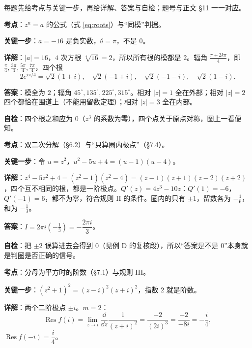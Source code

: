 \documentclass[11pt]{ctexart}
\renewcommand{\qbreak}{\needspace{0.32\textheight}}
\let\orighdr\hdr
\renewcommand{\hdr}[2]{\par\orighdr{#1}{#2}}
\begin{document}

每题先给考点与关键一步，再给详解、答案与自检；题号与正文 §11 一一对应。

\qbreak
{}

\textbf{考点}：$z^{n}=a$ 的公式（式 \eqref{eq:roots}）与“同模”判据。

\textbf{关键一步}：$a=-16$ 是负实数，$\theta=\pi$，不是 $0$。

\textbf{详解}：$|a|=16$，$4$ 次方根 $\sqrt[4]{16}=2$，所以所有根的模都是 $2$。辐角 $\frac{\pi+2k\pi}{4}$，即 $\frac{\pi}{4},\frac{3\pi}{4},\frac{5\pi}{4},\frac{7\pi}{4}$，四个根
\[ 2e^{i\pi/4}=\sqrt2(1+i),\quad \sqrt2(-1+i),\quad \sqrt2(-1-i),\quad \sqrt2(1-i). \]

\textbf{答案}：模全为 $2$；辐角 $45^\circ,135^\circ,225^\circ,315^\circ$。相对 $|z|=1$ 全在外部；相对 $|z|=2$ 四个都恰在围道上（不能用留数定理）；相对 $|z|=3$ 全在内部。

\textbf{自检}：四个根之和应为 $0$（$z^{3}$ 的系数为零），四个点关于原点对称，图上一看便知。

\qbreak
{}

\textbf{考点}：双二次分解（§6.2）与“只算圈内极点”（§7.4）。

\textbf{关键一步}：令 $u=z^{2}$，$u^{2}-5u+4=(u-1)(u-4)$。

\textbf{详解}：$z^{4}-5z^{2}+4=(z^{2}-1)(z^{2}-4)=(z-1)(z+1)(z-2)(z+2)$，四个互不相同的根，都是一阶极点。$Q'(z)=4z^{3}-10z$：$Q'(1)=-6$，$Q'(-1)=6$，都不为零，符合规则 II 的条件。圈内的只有 $\pm1$，留数各为 $-\frac16$，和为 $-\frac13$。

\textbf{答案}：$I=2\pi i\left(-\frac13\right)=-\dfrac{2\pi i}{3}$。

\textbf{自检}：把 $\pm2$ 误算进去会得到 $0$（见例 D 的复核段），所以“答案是不是 0”本身就是判圈是否正确的信号。

\qbreak
{}

\textbf{考点}：分母为平方时的阶数（§7.1）与规则 III。

\textbf{关键一步}：$(z^{2}+1)^{2}=(z-i)^{2}(z+i)^{2}$，指数 $2$ 就是阶数。

\textbf{详解}：两个二阶极点 $\pm i$。$m=2$：
\[ \operatorname{Res}f(i)=\lim_{z\to i}\frac{\dd}{\dd z}\frac{1}{(z+i)^{2}}=\frac{-2}{(2i)^{3}}=\frac{-2}{-8i}=-\frac{i}{4}, \]
$\operatorname{Res}f(-i)=\dfrac{i}{4}$。
\end{document}
